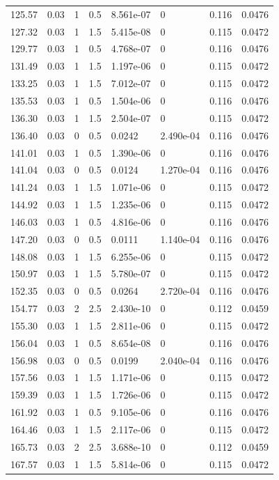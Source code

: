 \documentclass[preview]{standalone}
\begin{document}
{{{\begin{tabular}{L{1.2cm}C{1.2cm} C{0.3cm}C{0.5cm} C{1.4cm}C{1.4cm} C{1.4cm}C{1.4cm}}
  125.57  &  0.03  & 1     & 0.5 &  8.561e-07  & 0  & 0.116 &  0.0476   \\ 
  127.32  &  0.03  & 1     & 1.5 &  5.415e-08  & 0  & 0.115 &  0.0472   \\ 
  129.77  &  0.03  & 1     & 0.5 &  4.768e-07  & 0  & 0.116 &  0.0476   \\ 
  131.49  &  0.03  & 1     & 1.5 &  1.197e-06  & 0  & 0.115 &  0.0472   \\ 
  133.25  &  0.03  & 1     & 1.5 &  7.012e-07  & 0  & 0.115 &  0.0472   \\ 
  135.53  &  0.03  & 1     & 0.5 &  1.504e-06  & 0  & 0.116 &  0.0476   \\ 
  136.30  &  0.03  & 1     & 1.5 &  2.504e-07  & 0  & 0.115 &  0.0472   \\ 
  136.40  &  0.03  & 0     & 0.5 &  0.0242  & 2.490e-04  & 0.116 &  0.0476   \\ 
  141.01  &  0.03  & 1     & 0.5 &  1.390e-06  & 0  & 0.116 &  0.0476   \\ 
  141.04  &  0.03  & 0     & 0.5 &  0.0124  & 1.270e-04  & 0.116 &  0.0476   \\ 
  141.24  &  0.03  & 1     & 1.5 &  1.071e-06  & 0  & 0.115 &  0.0472   \\ 
  144.92  &  0.03  & 1     & 1.5 &  1.235e-06  & 0  & 0.115 &  0.0472   \\ 
  146.03  &  0.03  & 1     & 0.5 &  4.816e-06  & 0  & 0.116 &  0.0476   \\ 
  147.20  &  0.03  & 0     & 0.5 &  0.0111  & 1.140e-04  & 0.116 &  0.0476   \\ 
  148.08  &  0.03  & 1     & 1.5 &  6.255e-06  & 0  & 0.115 &  0.0472   \\ 
  150.97  &  0.03  & 1     & 1.5 &  5.780e-07  & 0  & 0.115 &  0.0472   \\ 
  152.35  &  0.03  & 0     & 0.5 &  0.0264  & 2.720e-04  & 0.116 &  0.0476   \\ 
  154.77  &  0.03  & 2     & 2.5 &  2.430e-10  & 0  & 0.112 &  0.0459   \\ 
  155.30  &  0.03  & 1     & 1.5 &  2.811e-06  & 0  & 0.115 &  0.0472   \\ 
  156.04  &  0.03  & 1     & 0.5 &  8.654e-08  & 0  & 0.116 &  0.0476   \\ 
  156.98  &  0.03  & 0     & 0.5 &  0.0199  & 2.040e-04  & 0.116 &  0.0476   \\ 
  157.56  &  0.03  & 1     & 1.5 &  1.171e-06  & 0  & 0.115 &  0.0472   \\ 
  159.39  &  0.03  & 1     & 1.5 &  1.726e-06  & 0  & 0.115 &  0.0472   \\ 
  161.92  &  0.03  & 1     & 0.5 &  9.105e-06  & 0  & 0.116 &  0.0476   \\ 
  164.46  &  0.03  & 1     & 1.5 &  2.117e-06  & 0  & 0.115 &  0.0472   \\ 
  165.73  &  0.03  & 2     & 2.5 &  3.688e-10  & 0  & 0.112 &  0.0459   \\ 
  167.57  &  0.03  & 1     & 1.5 &  5.814e-06  & 0  & 0.115 &  0.0472   \\ 
\hline 
\end{tabular} 

}}}
\end{document}
